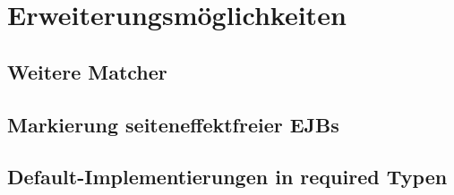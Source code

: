 \section{Erweiterungsmöglichkeiten}
\subsection{Weitere Matcher}
\subsection{Markierung seiteneffektfreier EJBs}
\subsection{Default-Implementierungen in required Typen}